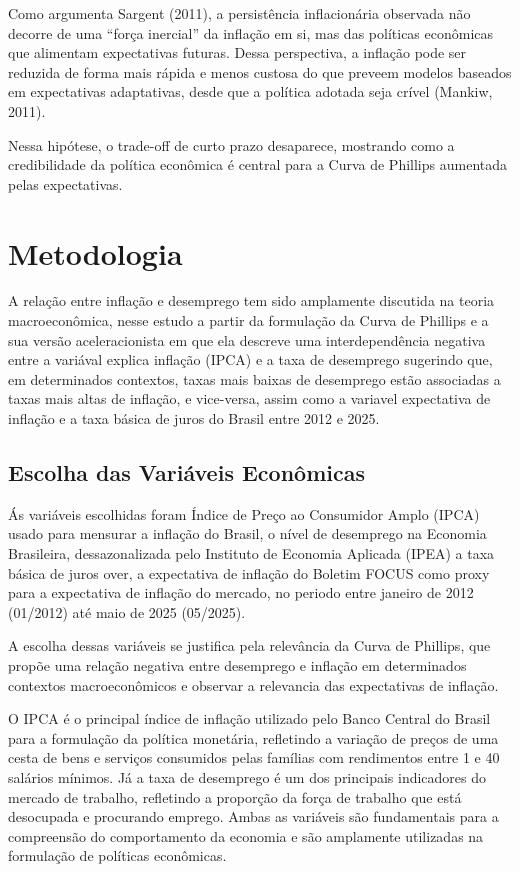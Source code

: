 \documentclass[12pt,oneside]{abntex2}
\begin{document}
Como argumenta Sargent (2011), a persistência inflacionária observada não decorre de uma “força inercial” da inflação em si, mas das políticas econômicas que alimentam expectativas futuras. Dessa perspectiva, a inflação pode ser reduzida de forma mais rápida e menos custosa do que preveem modelos baseados em expectativas adaptativas, desde que a política adotada seja crível (Mankiw, 2011).  

Nessa hipótese, o trade-off de curto prazo desaparece, mostrando como a credibilidade da política econômica é central para a Curva de Phillips aumentada pelas expectativas.

\section{\textbf{Metodologia}}

A relação entre inflação e desemprego tem sido amplamente discutida na teoria macroeconômica, nesse estudo a partir da formulação da Curva de Phillips e a sua versão aceleracionista em que ela descreve uma interdependência negativa entre a variával explica inflação (IPCA) e a taxa de desemprego sugerindo que, em determinados contextos, taxas mais baixas de desemprego estão associadas a taxas mais altas de inflação, e vice-versa, assim como a variavel expectativa de inflação e a taxa básica de juros do Brasil entre 2012 e 2025.

\subsection{\textbf{Escolha das Variáveis Econômicas}}

Ás variáveis escolhidas foram Índice de Preço ao Consumidor Amplo (IPCA) usado para mensurar a inflação do Brasil, o nível de desemprego na Economia Brasileira, dessazonalizada pelo Instituto de Economia Aplicada (IPEA) a taxa básica de juros over, a expectativa de inflação do Boletim FOCUS como proxy para a expectativa de inflação do mercado, no periodo entre janeiro de 2012 (01/2012) até maio de 2025 (05/2025).

A escolha dessas variáveis se justifica pela relevância da Curva de Phillips, que propõe uma relação negativa entre desemprego e inflação em determinados contextos macroeconômicos e observar a relevancia das expectativas de inflação. 

O IPCA é o principal índice de inflação utilizado pelo Banco Central do Brasil para a formulação da política monetária, refletindo a variação de preços de uma cesta de bens e serviços consumidos pelas famílias com rendimentos entre 1 e 40 salários mínimos. Já a taxa de desemprego é um dos principais indicadores do mercado de trabalho, refletindo a proporção da força de trabalho que está desocupada e procurando emprego. Ambas as variáveis são fundamentais para a compreensão do comportamento da economia e são amplamente utilizadas na formulação de políticas econômicas.
\end{document}
